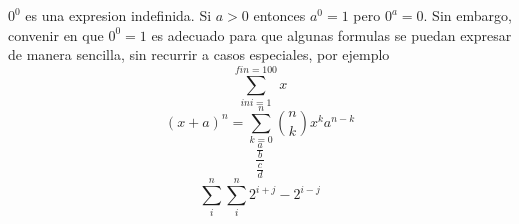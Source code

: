 \documentclass{article}
\begin{document}
$0^0$ es una expresion indefinida.
Si $a>0$ entonces $a^0=1$ pero $0^a=0.$
Sin embargo, convenir en que $0^0=1$ es adecuado para que
algunas formulas se puedan expresar de manera sencilla,
sin recurrir a casos especiales, por ejemplo
$$\sum _{ini=1}^{fin =100 }{x}$$
$$(x+a)^n=\sum_{k=0}^n \binom{n}{k}x^k a^{n-k}$$
$$\frac{\frac{a}{b}}{\frac{c}{d}}$$
$$\sum_i^n  \sum_i^n   2^{i+j} - 2^{i-j}$$
\end{document}
